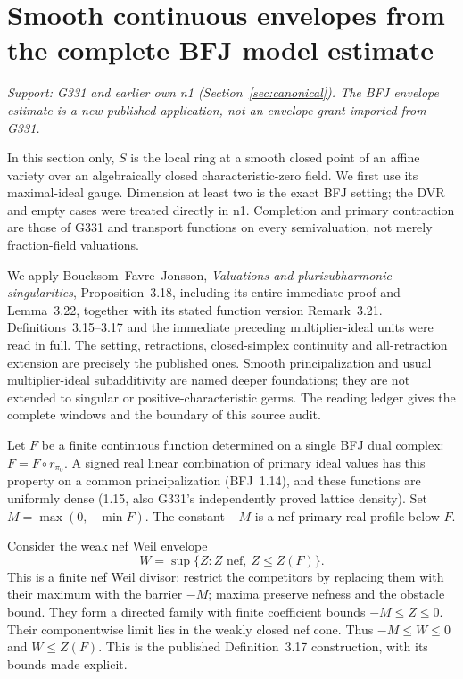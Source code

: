 \section{Smooth continuous envelopes from the complete BFJ model estimate}
\label{sec:smooth}
\textit{Support: G331 and earlier own n1 (Section~\ref{sec:canonical}). The BFJ envelope estimate is a new published application, not an envelope grant imported from G331.}

In this section only, $S$ is the local ring at a smooth closed point of an affine variety over an algebraically closed characteristic-zero field. We first use its maximal-ideal gauge. Dimension at least two is the exact BFJ setting; the DVR and empty cases were treated directly in n1. Completion and primary contraction are those of G331 and transport functions on every semivaluation, not merely fraction-field valuations.

We apply Boucksom--Favre--Jonsson, \emph{Valuations and plurisubharmonic singularities}, Proposition~3.18, including its entire immediate proof and Lemma~3.22, together with its stated function version Remark~3.21. Definitions~3.15--3.17 and the immediate preceding multiplier-ideal units were read in full. The setting, retractions, closed-simplex continuity and all-retraction extension are precisely the published ones. Smooth principalization and usual multiplier-ideal subadditivity are named deeper foundations; they are not extended to singular or positive-characteristic germs. The reading ledger gives the complete windows and the boundary of this source audit.

Let $F$ be a finite continuous function determined on a single BFJ dual complex: $F=F\circ r_{\pi_0}$. A signed real linear combination of primary ideal values has this property on a common principalization (BFJ~1.14), and these functions are uniformly dense (1.15, also G331's independently proved lattice density). Set $M=\max(0,-\min F)$. The constant $-M$ is a nef primary real profile below $F$.

Consider the weak nef Weil envelope
\[
 W=\sup\{Z:Z\text{ nef},\ Z\le Z(F)\}.
\]
This is a finite nef Weil divisor: restrict the competitors by replacing them with their maximum with the barrier $-M$; maxima preserve nefness and the obstacle bound. They form a directed family with finite coefficient bounds $-M\le Z\le0$. Their componentwise limit lies in the weakly closed nef cone. Thus $-M\le W\le0$ and $W\le Z(F)$. This is the published Definition~3.17 construction, with its bounds made explicit.

